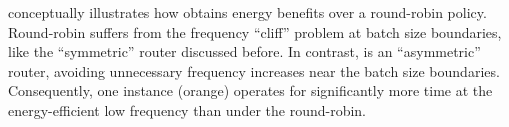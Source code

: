 

 conceptually illustrates how \router obtains energy benefits over a round-robin policy.
Round-robin suffers from the frequency ``cliff'' problem at batch size boundaries, like the ``symmetric'' router discussed before.
In contrast, \router is an ``asymmetric'' router, avoiding unnecessary frequency increases near the batch size boundaries.
Consequently, one instance (orange) operates for significantly more time at the energy-efficient low frequency than under the round-robin.



